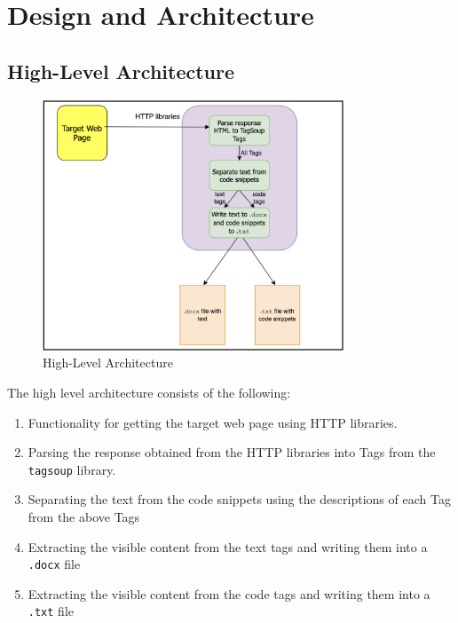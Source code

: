 \documentclass{scrreprt}
\begin{document}
\chapter{Design and Architecture}


\section{High-Level Architecture}

\begin{figure}[h]
    \centering
    \includegraphics[width=0.8\textwidth]{figures/high-arch.png}
    \caption{High-Level Architecture}
    \label{fig:high-level-arch}
\end{figure}

The high level architecture consists of the following:
\begin{enumerate}
    \item Functionality for getting the target web page using HTTP libraries.
    \item Parsing the response obtained from the HTTP libraries into Tags from the \texttt{tagsoup} library.
    \item Separating the text from the code snippets using the descriptions of each Tag from the above Tags
    \item Extracting the visible content from the text tags and writing them into a \texttt{.docx} file
    \item Extracting the visible content from the code tags and writing them into a \texttt{.txt} file
\end{enumerate}
\end{document}
